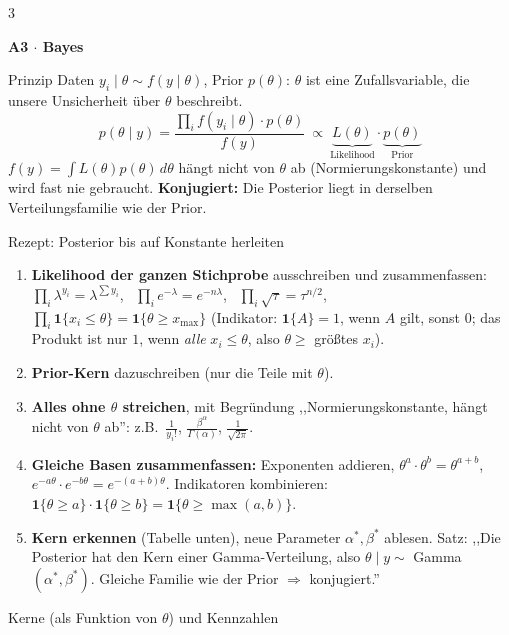\documentclass[8pt,a4paper,landscape]{extarticle}
\renewcommand{\arraystretch}{1.12}
\newcommand{\sect}[1]{\par\vspace{1pt}%
  {\fontsize{10}{11}\selectfont\bfseries #1}\par\nobreak\vspace{1pt}\nobreak}
\newcommand{\ra}{$\Rightarrow$}
\newcommand{\ind}{\mathbf{1}}
\begin{document}
\newpage
\begin{multicols*}{3}
\sect{A3 $\cdot$ Bayes}
\begin{wissen}{Prinzip}
Daten $y_i\mid\theta\sim f(y\mid\theta)$, Prior $p(\theta)$: $\theta$ ist eine Zufallsvariable, die unsere Unsicherheit über $\theta$ beschreibt.
$$p(\theta\mid y)=\frac{\prod_i f(y_i\mid\theta)\cdot p(\theta)}{f(y)}\ \propto\ \underbrace{L(\theta)}_{\text{Likelihood}}\cdot\underbrace{p(\theta)}_{\text{Prior}}$$
$f(y)=\int L(\theta)p(\theta)\,d\theta$ hängt nicht von $\theta$ ab (Normierungskonstante) und wird fast nie gebraucht.
\textbf{Konjugiert:} Die Posterior liegt in derselben Verteilungsfamilie wie der Prior.
\end{wissen}
\begin{rechnen}{Rezept: Posterior bis auf Konstante herleiten}
\begin{enumerate}[leftmargin=10pt]
\item \textbf{Likelihood der ganzen Stichprobe} ausschreiben und zusammenfassen: $\prod_i\lambda^{y_i}=\lambda^{\sum y_i}$, \ $\prod_ie^{-\lambda}=e^{-n\lambda}$, \ $\prod_i\sqrt\tau=\tau^{n/2}$, \ $\prod_i\ind\{x_i\le\theta\}=\ind\{\theta\ge x_{\max}\}$ (Indikator: $\ind\{A\}=1$, wenn $A$ gilt, sonst $0$; das Produkt ist nur $1$, wenn \emph{alle} $x_i\le\theta$, also $\theta\ge$ größtes $x_i$).
\item \textbf{Prior-Kern} dazuschreiben (nur die Teile mit $\theta$).
\item \textbf{Alles ohne $\theta$ streichen}, mit Begründung ,,Normierungskonstante, hängt nicht von $\theta$ ab'': z.B.\ $\frac{1}{y_i!}$, $\frac{\beta^\alpha}{\Gamma(\alpha)}$, $\frac{1}{\sqrt{2\pi}}$.
\item \textbf{Gleiche Basen zusammenfassen:} Exponenten addieren, $\theta^a\cdot\theta^b=\theta^{a+b}$, $e^{-a\theta}\cdot e^{-b\theta}=e^{-(a+b)\theta}$. Indikatoren kombinieren: $\ind\{\theta\ge a\}\cdot\ind\{\theta\ge b\}=\ind\{\theta\ge\max(a,b)\}$.
\item \textbf{Kern erkennen} (Tabelle unten), neue Parameter $\alpha^*,\beta^*$ ablesen. Satz: ,,Die Posterior hat den Kern einer Gamma-Verteilung, also $\theta\mid y\sim$ Gamma$(\alpha^*,\beta^*)$. Gleiche Familie wie der Prior \ra{} konjugiert.''
\end{enumerate}
\end{rechnen}
\begin{werkzeug}{Kerne (als Funktion von $\theta$) und Kennzahlen}
{\renewcommand{\arraystretch}{1.3}\begin{tabularx}{\linewidth}{@{}>{\raggedright\arraybackslash}p{1.95cm}>{\raggedright\arraybackslash}p{2.55cm}>{\raggedright\arraybackslash}X@{}}

\end{tabularx}}
\end{werkzeug}
\end{multicols*}
\end{document}
